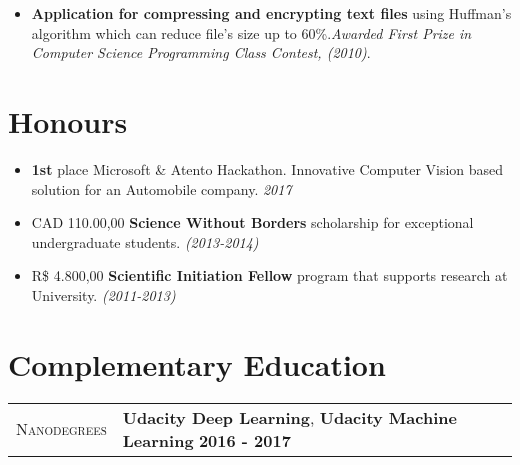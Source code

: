 \documentclass[9pt, a4paper, oneside, final]{scrartcl} %
\newcommand{\gray}{\rowcolor[gray]{.90}} %
\begin{document}
\begin{itemize}\itemsep1.0pt \parskip0pt 

\item \textbf{Application for compressing and encrypting text files} using Huffman's algorithm which can reduce file’s size up to 60\%.\textit{Awarded First Prize in Computer Science Programming Class Contest, (2010)}.

\end{itemize}

\section{Honours}

\begin{itemize}\itemsep1.0pt \parskip0pt 
\item \textbf{1st} place Microsoft \& Atento Hackathon. Innovative Computer Vision based solution for an Automobile company. \textit{2017}

\item CAD 110.00,00 \textbf{Science Without Borders} scholarship for exceptional undergraduate students. \textit{(2013-2014)}

\item R\$ 4.800,00 \textbf{Scientific Initiation Fellow} program that supports  research at University.\textit{ (2011-2013)}
\end{itemize} 

\section{Complementary Education}

\begin{center}
\begin{tabularx}{1.0\linewidth}{>{\raggedleft\scshape}p{2.2cm}X}
\gray Nanodegrees & \textbf{Udacity Deep Learning}, \textbf{Udacity Machine Learning} \hfill \textbf{2016 - 2017}\\
\end{tabularx}
\end{center}
\end{document}
